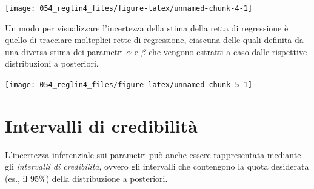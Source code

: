 \documentclass[
  10pt,
  italian,
  a4paper,
  extrafontsizes,onecolumn,openright
  ]{memoir}
\newenvironment{Shaded}{\begin{snugshade}}{\end{snugshade}}
\newcommand{\AttributeTok}[1]{\textcolor[rgb]{0.77,0.63,0.00}{#1}}
\newcommand{\ControlFlowTok}[1]{\textcolor[rgb]{0.13,0.29,0.53}{\textbf{#1}}}
\newcommand{\DecValTok}[1]{\textcolor[rgb]{0.00,0.00,0.81}{#1}}
\newcommand{\FunctionTok}[1]{\textcolor[rgb]{0.00,0.00,0.00}{#1}}
\newcommand{\NormalTok}[1]{#1}
\newcommand{\SpecialCharTok}[1]{\textcolor[rgb]{0.00,0.00,0.00}{#1}}
\newcommand{\StringTok}[1]{\textcolor[rgb]{0.31,0.60,0.02}{#1}}
\begin{document}
\begin{center}\texttt{[image: 054\_reglin4\_files/figure-latex/unnamed-chunk-4-1]} \end{center}

Un modo per visualizzare l'incertezza della stima della retta di regressione è quello di tracciare molteplici rette di regressione, ciascuna delle quali definita da una diversa stima dei parametri \(\alpha\) e \(\beta\) che vengono estratti a caso dalle rispettive distribuzioni a posteriori.

\begin{Shaded}
\end{Shaded}

\begin{center}\texttt{[image: 054\_reglin4\_files/figure-latex/unnamed-chunk-5-1]} \end{center}

\hypertarget{intervalli-di-credibilituxe0}{%
\section{Intervalli di credibilità}\label{intervalli-di-credibilituxe0}}

L'incertezza inferenziale sui parametri può anche essere rappresentata mediante gli \emph{intervalli di credibilità}, ovvero gli intervalli che contengono la quota desiderata (es., il 95\%) della distribuzione a posteriori.
\end{document}
